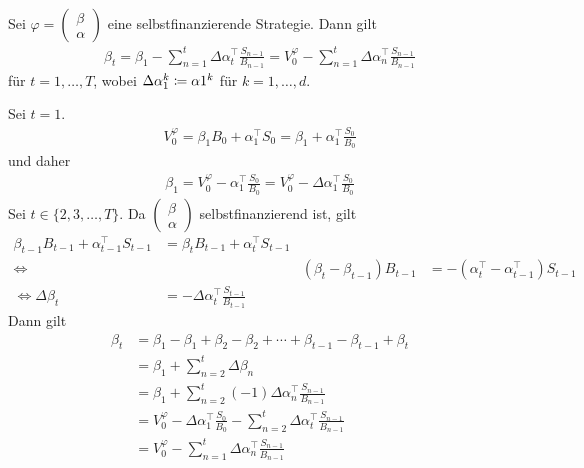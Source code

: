 \documentclass[a4paper,twoside,DIV15,BCOR12mm]{scrbook}
\begin{document}
\begin{lemma}
Sei $\varphi 
=\left(\begin{smallmatrix}
\beta \\ \alpha
\end{smallmatrix}\right)$ eine selbstfinanzierende Strategie. Dann gilt
\begin{align*}
\beta_t = \beta_1 - \sum_{n=1}^t \Delta \alpha_t^\top \frac{S_{n-1}}{B_{n-1}} 
= V_0^\varphi - \sum_{n=1}^t \Delta \alpha_n^\top \frac{S_{n-1}}{B_{n-1}}
\end{align*}
für $t=1,\ldots,T$, wobei $\Delta\alpha_1^k \da \alpha 1^k$ für $k=1,\ldots,d$.\label{lem:2.3.5}
\end{lemma}

\begin{beweis}
Sei $t=1$.
\begin{align*}
V_0^\varphi = \beta_1 B_0 + \alpha_1^\top S_0 = \beta_1 + \alpha_1^\top \frac{S_0}{B_0}
\end{align*}
und daher 
\begin{align*}
\beta_1 = V_0^\varphi - \alpha_1^\top \frac{S_0}{B_0} = V_0^\varphi - \Delta \alpha_1^\top \frac{S_0}{B_0}
\end{align*}
Sei $t\in\{2,3,\ldots,T\}$. Da $
\left(\begin{smallmatrix} \beta \\ \alpha \end{smallmatrix}\right)$
 selbstfinanzierend ist, gilt
\begin{align*}
\beta_{t-1}B_{t-1} + \alpha_{t-1}^\top S_{t-1} &=\beta_t B_{t-1} + \alpha_t^\top S_{t-1} \\
\iff && (\beta_t - \beta_{t-1})B_{t-1} &=  -(\alpha_t^\top - \alpha_{t-1}^\top)S_{t-1} \\
\iff \Delta \beta_t &= - \Delta \alpha_t^\top \frac{S_{t-1}}{B_{t-1}}
\end{align*}
Dann gilt
\begin{align*}
\beta_t &= \beta_1 - \beta_1 + \beta_2 - \beta_2 + \cdots + \beta_{t-1} -\beta_{t-1} + \beta_t\\
&= \beta_1 + \sum_{n=2}^t \Delta \beta_n\\
&= \beta_1 + \sum_{n=2}^t (-1)\Delta \alpha_n^\top \frac{S_{n-1}}{B_{n-1}}\\
&= V_0^\varphi - \Delta\alpha_1^\top \frac{S_0}{B_0} - \sum_{n=2}^t \Delta \alpha_t^\top \frac{S_{n-1}}{B_{n-1}} \\
&= V_0^\varphi - \sum_{n=1}^t \Delta \alpha_n ^\top \frac{S_{n-1}}{B_{n-1}}
\end{align*}
\end{beweis}
\end{document}
